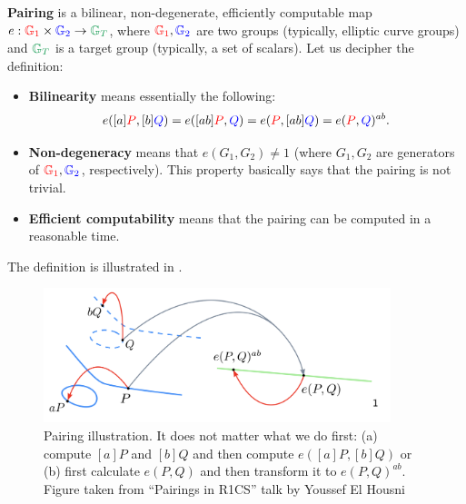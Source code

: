 \documentclass[../lecture-notes.tex]{subfiles}
\begin{document}
\begin{definition}
    \textbf{Pairing} is a bilinear, non-degenerate, efficiently computable map $e: \textcolor{red}{\mathbb{G}_1} \times \textcolor{blue}{\mathbb{G}_2} \to \textcolor{ForestGreen}{\mathbb{G}_T}$, where $\textcolor{red}{\mathbb{G}_1},\textcolor{blue}{\mathbb{G}_2}$ are two groups (typically, elliptic curve groups) and $\textcolor{ForestGreen}{\mathbb{G}_T}$ is a target group (typically, a set of scalars). Let us decipher the definition:
    \begin{itemize}
        \item \textbf{Bilinearity} means essentially the following:
        \begin{equation*}
            e([a]\textcolor{red}{P},[b]\textcolor{blue}{Q}) = e([ab]\textcolor{red}{P},\textcolor{blue}{Q}) = e(\textcolor{red}{P},[ab]\textcolor{blue}{Q}) = e(\textcolor{red}{P},\textcolor{blue}{Q})^{ab}.        
        \end{equation*}
        \item \textbf{Non-degeneracy} means that $e(G_1,G_2) \neq 1$ (where $G_1,G_2$ are generators of $\textcolor{red}{\mathbb{G}_1},\textcolor{blue}{\mathbb{G}_2}$, respectively). This property basically says that the pairing is not trivial.
        \item \textbf{Efficient computability} means that the pairing can be computed in a reasonable time.
    \end{itemize}

    The definition is illustrated in .
\end{definition}

\begin{figure}[H]
    \centering
    \includegraphics[width=0.9\textwidth]{images/lecture_4/pairing.png}
    \caption{Pairing illustration. It does not matter what we do first: (a) compute $[a]P$ and $[b]Q$ and then compute $e([a]P,[b]Q)$ or (b) first calculate $e(P,Q)$ and then transform it to $e(P,Q)^{ab}$. {Figure taken from ``Pairings in R1CS'' talk by Youssef El Housni}}
    \label{fig:ecpairing}
\end{figure}
\end{document}
